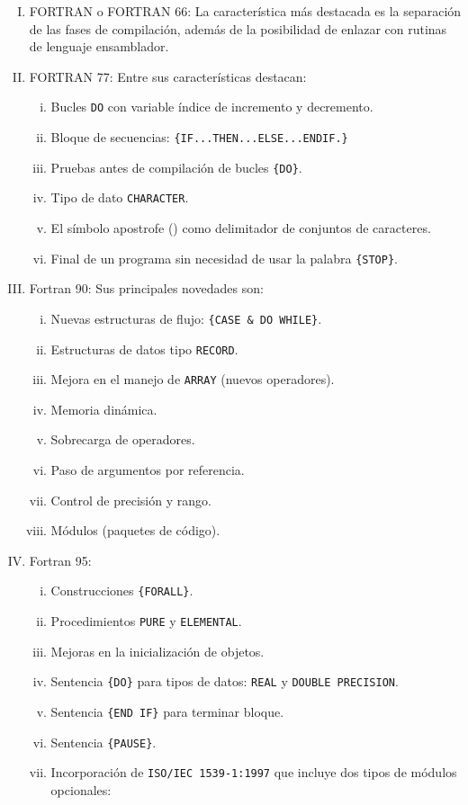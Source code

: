 \begin{enumerate}[I.]
\item FORTRAN o FORTRAN 66: La característica más destacada es la separación de
las fases de compilación, además de la posibilidad de enlazar con rutinas de
lenguaje ensamblador.
\item {}FORTRAN 77: Entre sus características destacan:
\begin{enumerate}[i.]
\item Bucles \texttt{DO} con variable índice de incremento y decremento.
\item Bloque de secuencias: \texttt{\{IF...THEN...ELSE...ENDIF.\}}
\item Pruebas antes de compilación de bucles \texttt{\{DO\}}.
\item Tipo de dato \texttt{CHARACTER}.
\item El símbolo apostrofe (\texttt{\textquotesingle}) como delimitador de
conjuntos de caracteres.
\item Final de un programa sin necesidad de usar la palabra \texttt{\{STOP\}}.
\end{enumerate}
\item {}Fortran 90:  Sus principales novedades son:
\begin{enumerate}[i.]
\item Nuevas estructuras de flujo: \texttt{\{CASE \& DO WHILE\}}.
\item Estructuras de datos tipo \texttt{RECORD}.
\item Mejora en el manejo de \texttt{ARRAY} (nuevos operadores).
\item Memoria dinámica.
\item Sobrecarga de operadores.
\item Paso de argumentos por referencia.
\item Control de precisión y rango.
\item Módulos (paquetes de código).
\end{enumerate}
\item {}Fortran 95: 
\begin{enumerate}[i.]
\item Construcciones \texttt{\{FORALL\}}.
\item Procedimientos \texttt{PURE} y \texttt{ELEMENTAL}.
\item Mejoras en la inicialización de objetos.
\item Sentencia \texttt{\{DO\}} para tipos de datos: \texttt{REAL} y
\texttt{DOUBLE PRECISION}.
\item Sentencia \texttt{\{END IF\}} para terminar bloque.
\item Sentencia \texttt{\{PAUSE\}}.
\item Incorporación de \texttt{ISO/IEC 1539-1:1997} que incluye dos tipos de
módulos opcionales:


\end{enumerate}
\end{enumerate}

